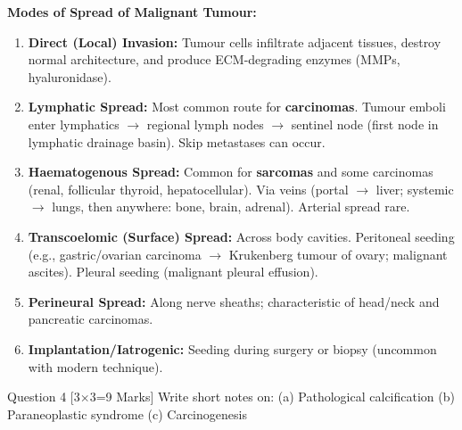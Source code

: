 \documentclass[11pt,a4paper]{article}
\begin{document}
\begin{ansbox}
\textbf{Modes of Spread of Malignant Tumour:}
\begin{enumerate}[leftmargin=*]
    \item \textbf{Direct (Local) Invasion:} Tumour cells infiltrate adjacent tissues, destroy normal architecture, and produce ECM-degrading enzymes (MMPs, hyaluronidase).
    \item \textbf{Lymphatic Spread:} Most common route for \textbf{carcinomas}. Tumour emboli enter lymphatics $\rightarrow$ regional lymph nodes $\rightarrow$ sentinel node (first node in lymphatic drainage basin). Skip metastases can occur.
    \item \textbf{Haematogenous Spread:} Common for \textbf{sarcomas} and some carcinomas (renal, follicular thyroid, hepatocellular). Via veins (portal $\rightarrow$ liver; systemic $\rightarrow$ lungs, then anywhere: bone, brain, adrenal). Arterial spread rare.
    \item \textbf{Transcoelomic (Surface) Spread:} Across body cavities. Peritoneal seeding (e.g., gastric/ovarian carcinoma $\rightarrow$ Krukenberg tumour of ovary; malignant ascites). Pleural seeding (malignant pleural effusion).
    \item \textbf{Perineural Spread:} Along nerve sheaths; characteristic of head/neck and pancreatic carcinomas.
    \item \textbf{Implantation/Iatrogenic:} Seeding during surgery or biopsy (uncommon with modern technique).
\end{enumerate}
\end{ansbox}

\begin{qbox}{Question 4 [3$\times$3=9 Marks]}
Write short notes on: (a) Pathological calcification \quad (b) Paraneoplastic syndrome \quad (c) Carcinogenesis
\end{qbox}
\end{document}
